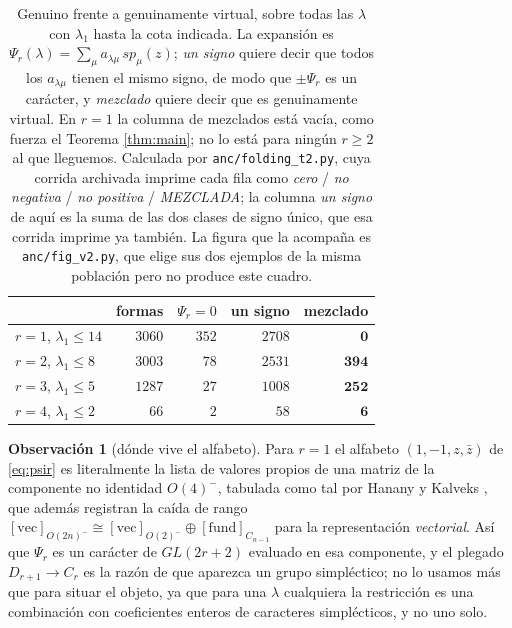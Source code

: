 \documentclass[11pt,reqno]{amsart}
\theoremstyle{plain}
\theoremstyle{definition}
\newtheorem{remark}[theorem]{Observación}
\begin{document}
\begin{table}[!ht]
\centering\small
\caption{Genuino frente a genuinamente virtual, sobre todas las $\lambda$ con $\lambda_1$ hasta la
cota indicada. La expansión es $\Psi_r(\lambda)=\sum_\mu a_{\lambda\mu}\,sp_\mu(z)$; \emph{un signo}
quiere decir que todos los $a_{\lambda\mu}$ tienen el mismo signo, de modo que $\pm\Psi_r$ es un
carácter, y \emph{mezclado} quiere decir que es genuinamente virtual. En $r=1$ la columna de mezclados
está vacía, como fuerza el Teorema \ref{thm:main}; no lo está para ningún $r\ge2$ al que lleguemos.
Calculada por \texttt{anc/folding\_t2.py}, cuya corrida archivada imprime cada fila como \emph{cero}
/ \emph{no negativa} / \emph{no positiva} / \emph{MEZCLADA}; la columna \emph{un signo} de aquí es la
suma de las dos clases de signo único, que esa corrida imprime ya también. La figura que la acompaña
es \texttt{anc/fig\_v2.py}, que elige sus dos ejemplos de la misma población pero no produce este
cuadro.}
\label{tab:virtual}
\begin{tabular}{@{}lrrrr@{}}
\toprule
 & \multicolumn{1}{c}{formas} & \multicolumn{1}{c}{$\Psi_r=0$} & \multicolumn{1}{c}{un signo}
 & \multicolumn{1}{c}{mezclado} \\
\midrule
\rowcolor{hband} $r=1$, $\lambda_1\le14$ & $3060$ & $352$ & $2708$ & \textcolor{hproved}{$\mathbf{0}$} \\
$r=2$, $\lambda_1\le8$  & $3003$ & $78$ & $2531$ & \textcolor{hverif}{$\mathbf{394}$} \\
$r=3$, $\lambda_1\le5$  & $1287$ & $27$ & $1008$ & \textcolor{hverif}{$\mathbf{252}$} \\
$r=4$, $\lambda_1\le2$  & $66$   & $2$  & $58$   & \textcolor{hverif}{$\mathbf{6}$} \\
\bottomrule
\end{tabular}
\end{table}

\begin{remark}[dónde vive el alfabeto]
Para $r=1$ el alfabeto $(1,-1,z,\bar z)$ de \eqref{eq:psir} es literalmente la lista de valores
propios de una matriz de la componente no identidad $O(4)^{-}$, tabulada como tal por Hanany y
Kalveks \cite[Tabla 7]{HK16}, que además registran la caída de rango
$[\mathrm{vec}]_{O(2n)^{-}}\cong[\mathrm{vec}]_{O(2)^{-}}\oplus[\mathrm{fund}]_{C_{n-1}}$ para la
representación \emph{vectorial}. Así que $\Psi_r$ es un carácter de $GL(2r+2)$ evaluado en esa
componente, y el plegado $D_{r+1}\to C_r$ es la razón de que aparezca un grupo simpléctico; no lo
usamos más que para situar el objeto, ya que para una $\lambda$ cualquiera la restricción es una
combinación con coeficientes enteros de caracteres simplécticos, y no uno solo.
\end{remark}
\end{document}
